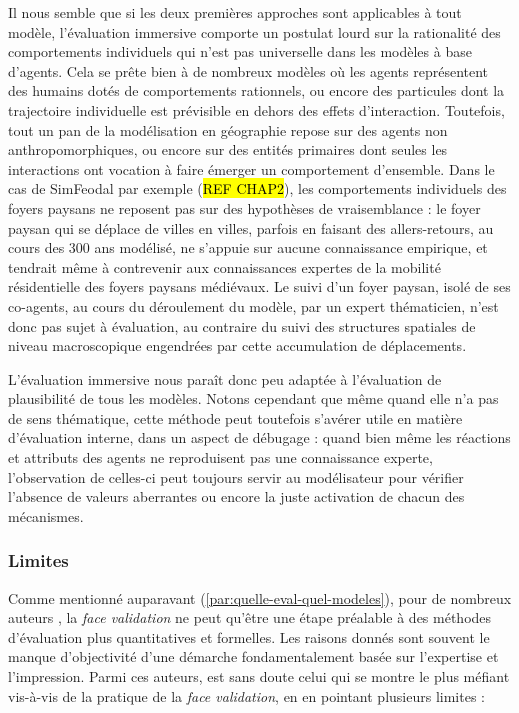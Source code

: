 Il nous semble que si les deux premières approches sont applicables à tout modèle, l'évaluation immersive comporte un postulat lourd sur la rationalité des comportements individuels qui n'est pas universelle dans les modèles à base d'agents.
Cela se prête bien à de nombreux modèles où les agents représentent des humains dotés de comportements rationnels, ou encore des particules dont la trajectoire individuelle est prévisible en dehors des effets d'interaction.
Toutefois, tout un pan de la modélisation en géographie repose sur des agents non anthropomorphiques, ou encore sur des entités primaires dont seules les interactions ont vocation à faire émerger un comportement d'ensemble.
Dans le cas de SimFeodal par exemple (\hl{REF CHAP2}), les comportements individuels des foyers paysans ne reposent pas sur des hypothèses de vraisemblance : le foyer paysan qui se déplace de villes en villes, parfois en faisant des allers-retours, au cours des 300 ans modélisé, ne s'appuie sur aucune connaissance empirique, et tendrait même à contrevenir aux connaissances expertes de la mobilité résidentielle des foyers paysans médiévaux.
Le suivi d'un foyer paysan, isolé de ses co-agents, au cours du déroulement du modèle, par un expert thématicien, n'est donc pas sujet à évaluation, au contraire du suivi des structures spatiales de niveau macroscopique engendrées par cette accumulation de déplacements.

L'évaluation immersive nous paraît donc peu adaptée à l'évaluation de plausibilité de tous les modèles.
Notons cependant que même quand elle n'a pas de sens thématique, cette méthode peut toutefois s'avérer utile en matière d'évaluation interne, dans un aspect de \og débugage\fg{} : quand bien même les réactions et attributs des agents ne reproduisent pas une connaissance experte, l'observation de celles-ci peut toujours servir au modélisateur pour vérifier l'absence de valeurs aberrantes ou encore la juste activation de chacun des mécanismes.


\subsubsection{Limites}

Comme mentionné auparavant (\ref{par:quelle-eval-quel-modeles}), pour de nombreux auteurs \autocite{hermann_validation_1967, balci_validation_1994, kennedy_verification_2006}, la \textit{face validation} ne peut qu'être une étape préalable à des méthodes d'évaluation plus quantitatives et formelles.
Les raisons donnés sont souvent le manque d'objectivité d'une démarche fondamentalement basée sur l'expertise et l'impression.
Parmi ces auteurs, \citeauthor{hermann_validation_1967} est sans doute celui qui se montre le plus méfiant vis-à-vis de la pratique de la \textit{face validation}, en en pointant plusieurs limites :


